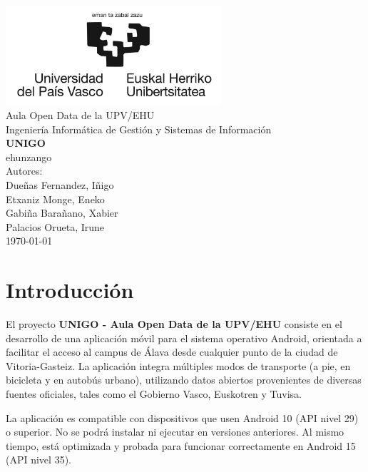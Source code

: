 \documentclass[a4paper,12pt]{report}
\begin{document}
  \begin{titlepage}
    \centering
    \includegraphics[width=0.6\textwidth]{img/ehuLogoLargo.jpg}\\
    \vspace{1cm}
    \LARGE Aula Open Data de la UPV/EHU\\
    \vspace{0.5cm}
    \Large Ingeniería Informática de Gestión y Sistemas de Información\\
    \vspace{3cm}
    \vspace{0.5cm}
    \Huge \textbf{UNIGO}\\
    \huge ehunzango\\
    \vspace{2.5cm}
    \Large Autores:\\
    \vspace{0.2cm}
    \large Dueñas Fernandez, Iñigo\\
    \large Etxaniz Monge, Eneko\\
    \large Gabiña Barañano, Xabier\\
    \large Palacios Orueta, Irune\\
    \vfill
    \today
  \end{titlepage}
  
\chapter{Introducción}
  El proyecto \textbf{UNIGO - Aula Open Data de la UPV/EHU} consiste en el desarrollo de una aplicación móvil para el sistema operativo Android, orientada a facilitar el acceso al campus de Álava desde cualquier punto de la ciudad de Vitoria-Gasteiz. La aplicación integra múltiples modos de transporte (a pie, en bicicleta y en autobús urbano), utilizando datos abiertos provenientes de diversas fuentes oficiales, tales como el Gobierno Vasco, Euskotren y Tuvisa.
  
  La aplicación es compatible con dispositivos que usen Android 10 (API nivel 29) o superior. No se podrá instalar ni ejecutar en versiones anteriores. Al mismo tiempo, está optimizada y probada para funcionar correctamente en Android 15 (API nivel 35).
\end{document}
